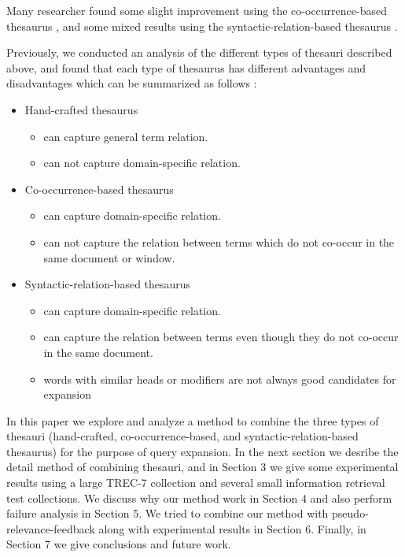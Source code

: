 Many researcher found some slight improvement using the co-occurrence-based thesaurus \cite{qiu93,schutze97}, and some mixed results using the syntactic-relation-based thesaurus \cite{jing94,grefenstette94}.

Previously, we conducted an analysis of the different types of thesauri described above, and found that each type of thesaurus has different advantages and disadvantages \cite{mandala99a,mandala99b,mandala99c,mandala99d} which can be summarized as follows :

\begin{itemize}
\item Hand-crafted thesaurus
      \begin{itemize}
            \item can capture general term relation.
            \item can not capture domain-specific relation.
      \end{itemize}
\item Co-occurrence-based thesaurus
      \begin{itemize}
            \item can capture domain-specific relation.
            \item can not capture the relation between terms which do not co-occur in the same                   document or window.
      \end{itemize}
\item Syntactic-relation-based thesaurus
      \begin{itemize}
            \item can capture domain-specific relation.
            \item can capture the relation between terms even though they do not co-occur in the same document.
            \item words with similar heads or modifiers are not always good candidates for expansion
      \end{itemize}

\end{itemize}

In this paper we explore and analyze  a method to combine the three types of thesauri (hand-crafted, co-occurrence-based, and syntactic-relation-based thesaurus) for the purpose of query expansion. In the next section we desribe the detail method of combining thesauri, and in Section 3 we give some experimental results using a large TREC-7 collection and several small information retrieval test collections. We  discuss why our method work in Section 4 and  also perform failure analysis in Section 5. We tried to combine our method with pseudo-relevance-feedback along with experimental results in Section 6. Finally, in Section 7 we give conclusions and future work. 

